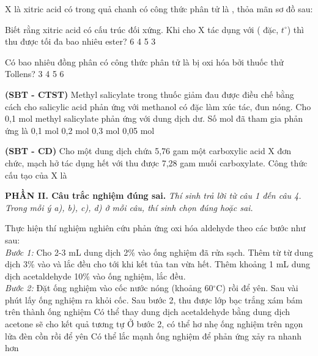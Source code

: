 \documentclass[12pt,a4paper]{article}
\begin{document}
\begin{ex}
X là xitric acid có trong quả chanh có công thức phân tử là , thỏa mãn sơ đồ sau:
\begin{center}
\end{center}
Biết rằng xitric acid có cấu trúc đối xứng. Khi cho X tác dụng với  ( đặc, $t^\circ$) thì thu được tối đa bao nhiêu ester?
\choice
{6}
{4}
{5}
{3}
\end{ex}

\begin{ex}
Có bao nhiêu đồng phân có công thức phân tử là  bị oxi hóa bởi thuốc thử Tollens?
\choice
{3}
{4}
{5}
{6}
\end{ex}

\begin{ex}
\textbf{(SBT - CTST)} Methyl salicylate trong thuốc giảm đau được điều chế bằng cách cho salicylic acid phản ứng với methanol có  đặc làm xúc tác, đun nóng. Cho 0,1 mol methyl salicylate phản ứng với dung dịch  dư. Số mol  đã tham gia phản ứng là
\choice
{0,1 mol}
{0,2 mol}
{0,3 mol}
{0,05 mol}
\end{ex}

\begin{ex}
\textbf{(SBT - CD)} Cho một dung dịch chứa 5,76 gam một carboxylic acid X đơn chức, mạch hở tác dụng hết với  thu được 7,28 gam muối carboxylate. Công thức cấu tạo của X là
\choice
{}
{}
{}
{}
\end{ex}

\bigskip
\noindent\textbf{\large PHẦN II. Câu trắc nghiệm đúng sai.}
\textit{Thí sinh trả lời từ câu 1 đến câu 4. Trong mỗi ý a), b), c), d) ở mỗi câu, thí sinh chọn đúng hoặc sai.}
\vspace{0.2cm}

\begin{ex}
Thực hiện thí nghiệm nghiên cứu phản ứng oxi hóa aldehyde theo các bước như sau:\\
\textit{Bước 1:} Cho 2-3 mL dung dịch  2\% vào ống nghiệm đã rửa sạch. Thêm từ từ dung dịch  3\% vào và lắc đều cho tới khi kết tủa tan vừa hết. Thêm khoảng 1 mL dung dịch acetaldehyde 10\% vào ống nghiệm, lắc đều.\\
\textit{Bước 2:} Đặt ống nghiệm vào cốc nước nóng (khoảng 60$^\circ$C) rồi để yên. Sau vài phút lấy ống nghiệm ra khỏi cốc.
\choiceTF
{Sau bước 2, thu được lớp bạc trắng xám bám trên thành ống nghiệm}
{Có thể thay dung dịch acetaldehyde bằng dung dịch acetone sẽ cho kết quả tương tự}
{Ở bước 2, có thể hơ nhẹ ống nghiệm trên ngọn lửa đèn cồn rồi để yên}
{Có thể lắc mạnh ống nghiệm để phản ứng xảy ra nhanh hơn}
\end{ex}
\end{document}
